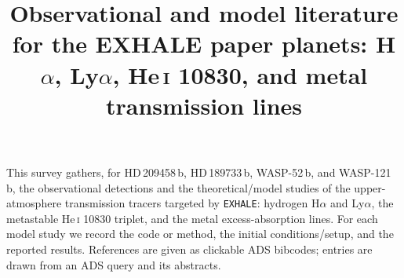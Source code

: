 \documentclass[english,a4paper]{my_memo}
\title{Observational and model literature for the EXHALE paper planets:
       H$\alpha$, Ly$\alpha$, He\,\textsc{i} 10830, and metal transmission lines}
\begin{document}
\maketitle

\noindent This survey gathers, for HD\,209458\,b, HD\,189733\,b, WASP-52\,b, and
WASP-121\,b, the observational detections and the theoretical/model studies of the
upper-atmosphere transmission tracers targeted by \texttt{EXHALE}: hydrogen
H$\alpha$ and Ly$\alpha$, the metastable He\,\textsc{i} 10830 triplet, and the
metal excess-absorption lines. For each model study we record the code or method,
the initial conditions/setup, and the reported results. References are given as
clickable ADS bibcodes; entries are drawn from an ADS query and its abstracts.






\clearpage

\end{document}
